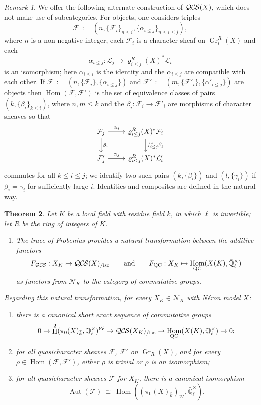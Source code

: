 \documentclass[10pt]{amsart}
\makeatletter
\theoremstyle{plain}
\newtheorem{theorem}{Theorem}[section]
\theoremstyle{definition}
\theoremstyle{remark}
\newtheorem{remark}[theorem]{Remark}
\newcommand{\EE}{\mathbb{\bar Q}_\ell}
\newcommand{\bFq}{\bar{k}}
\newcommand{\Fq}{k}
\newcommand{\EEx}{\EE^\times}
\newcommand{\Weil}[1]{\mathcal{W}_{#1}}
\DeclareMathOperator{\Aut}{Aut}
\DeclareMathOperator{\Hom}{Hom}
\DeclareMathOperator{\Gr}{Gr}
\DeclareMathOperator{\Hh}{H}
\newcommand{\ceq}{{\, :=\, }}
\newcommand{\iso}{{\ \cong\ }}
\newcommand{\cs}[1]{{\mathcal{#1}}}
\newcommand{\QCS}{{\mathcal{QC\hskip-0.8pt S}}}
\newcommand{\QCSiso}[1]{\QCS(#1)_{/\text{iso}}}
\newcommand{\labitem}[2]{
\def\@itemlabel{\textbf{#1}}
\item
\def\@currentlabel{#1}\label{#2}}
\makeatother
\begin{document}
\begin{remark}
We offer the following alternate construction of $\QCS(X)$, which does not make use of subcategories.
For objects, one considers triples 
\[
\cs{F} \ceq (n, \{\cs{F}_i\}_{n\leq i}, \{\alpha_{i \le j}\}_{n\le i \le j}),
\] where $n$
is a non-negative integer, each $\cs{F}_i$ is a character sheaf on $\Gr^R_i(X)$ and each 
\[
\alpha_{i \le j} : \cs{L}_j \to \varrho^R_{i \le j}(X)^* \cs{L}_i
\]
 is an isomorphism; here $\alpha_{i \le i}$ is the identity and the $\alpha_{i \le j}$ are compatible with each other.  
If $\cs{F} \ceq (n, \{\cs{F}_i\}, \{\alpha_{i \le j}\})$
and $\cs{F}' \ceq (m, \{\cs{F}'_i\}, \{\alpha'_{i \le j}\})$ are objects then $\Hom(\cs{F}, \cs{F}')$ is the set
of equivalence classes of pairs $(k, \{\beta_i\}_{k \le i})$, where $n,m \le k$ and the $\beta_i : \cs{F}_i \to \cs{F}'_i$ are
morphisms of character sheaves so that
\[
\begin{tikzcd}
\cs{F}_j \rar{\alpha_j} \dar{\beta_i} & \varrho^R_{i \le j}(X)^* \cs{F}_i \dar{f_{i \le j}^*\beta_j} \\
\cs{F}'_j \rar{\alpha_j} & \varrho^R_{i \le j}(X)^* \cs{L}'_i
\end{tikzcd}
\]
commutes for all $k\le i\le j$; we identify two such pairs $(k, \{\beta_i\})$ and $(l, \{\gamma_i\})$ if $\beta_i = \gamma_i$
for sufficiently large $i$.  Identities and composites are defined in the natural way.
\end{remark}


\begin{theorem}\label{thm:CSXK}
Let $K$ be a local field with residue field $\Fq$, in which $\ell$ is invertible; 
let $R$ be the ring of integers of $K$.
\begin{enumerate}
\labitem{(1)}{x1}
The trace of Frobenius provides a natural transformation between the additive functors
\[
F_{\QCS}: X_K \mapsto \QCSiso{X}
\qquad\text{and}\qquad
F_{\text{QC}}: X_K \mapsto \Hom_{\text{QC}}(X(K),\EEx)
\]
as functors from $\mathcal{N}_K$ to the category of commutative groups.
\end{enumerate} 
Regarding this natural transformation, for every $X_K \in \mathcal{N}_K$ with N\'eron model $X$:
\begin{enumerate}[resume]
\labitem{(2)}{x2} there is a canonical short exact sequence of commutative groups 
\[
0 \to \Hh^2(\pi_0(X)_{\bFq},\EEx)^{\Weil{}} \to \QCSiso{X_K} \to \Hom_\text{QC}(X(K),\EEx) \to 0;
\] 
\labitem{(3)}{x3} for all quasicharacter sheaves $\cs{F}$, $\cs{F}'$ on $\Gr_R(X)$, and for every $\rho \in \Hom(\cs{F},\cs{F}')$, either $\rho$ is trivial or $\rho$ is an isomorphism;
\labitem{(4)}{x4} for all quasicharacter sheaves $\cs{F}$ for $X_K$, there is a canonical isomorphism
\[
\Aut(\cs{F}) \iso \Hom((\pi_0(X)_{\bFq})_{\Weil{}},\EEx).
\]
\end{enumerate}
\end{theorem}
\end{document}
